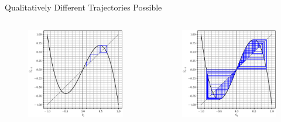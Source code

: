 \documentclass{beamer}
\begin{document}
\begin{frame}{Qualitatively Different Trajectories Possible}
	\begin{columns}
	\begin{column}{0.5\textwidth}
		\begin{figure}
			\centering
			\includegraphics[width=1.2\textwidth]{2-cyclic.eps}
		\end{figure}
	\end{column}
	\begin{column}{0.5\textwidth}
		\begin{figure}
			\centering
			\includegraphics[width=1.2\textwidth]{chaos_uncontained.eps}
		\end{figure}
	\end{column}
	\end{columns}
\end{frame}
\end{document}
